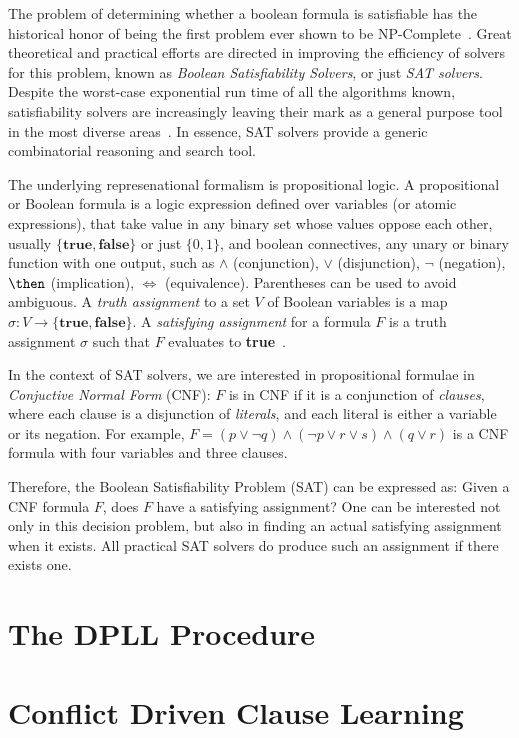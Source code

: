 The problem of determining whether a boolean formula is satisfiable has the
historical honor of being the first problem ever shown to be
NP-Complete~\cite{Cook}. Great theoretical and practical efforts are directed
in improving the efficiency of solvers for this problem, known as \emph{Boolean
Satisfiability Solvers}, or just \emph{SAT solvers}. Despite the worst-case
exponential run time of all the algorithms known, satisfiability solvers are
increasingly leaving their mark as a general purpose tool in the most diverse
areas~\cite{satchapter}. In essence, SAT solvers provide a generic combinatorial
reasoning and search tool. 

The underlying represenational formalism is propositional logic. A propositional
or Boolean formula is a logic expression defined over variables (or atomic
expressions), that take value in any binary set whose values oppose each other,
usually $\{\textbf{true}, \textbf{false}\}$ or just $\{0,1\}$, and boolean
connectives, any unary or binary function with one output, such as
$\land$ (conjunction), $\lor$ (disjunction), $\neg$ (negation), $\then$
(implication), $\iff$ (equivalence). Parentheses can be used to avoid ambiguous.
A \emph{truth assignment} to a set $V$ of Boolean variables is a map $\sigma : V
\rightarrow \{\textbf{true}, \textbf{false}\}$. A \emph{satisfying assignment}
for a formula $F$ is a truth assignment $\sigma$ such that $F$ evaluates to
\textbf{true}~\cite{satchapter}.

In the context of SAT solvers, we are interested in propositional formulae in
\emph{Conjuctive Normal Form} (CNF): $F$ is in CNF if it is a conjunction of
\emph{clauses}, where each clause is a disjunction of \emph{literals}, and each
literal is either a variable or its negation. For example, $F = (p \lor \neg q)
\land (\neg p \lor r \lor s) \land (q \lor r)$ is a CNF formula with four variables and
three clauses.

Therefore, the Boolean Satisfiability Problem (SAT) can be expressed as: Given a
CNF formula $F$, does $F$ have a satisfying assignment? One can be interested
not only in this decision problem, but also in finding an actual satisfying
assignment when it exists. All practical SAT solvers do produce such an
assignment if there exists one.

\section{The DPLL Procedure}
\label{sec:dpll}

\section{Conflict Driven Clause Learning}
\label{sec:cdcl}
